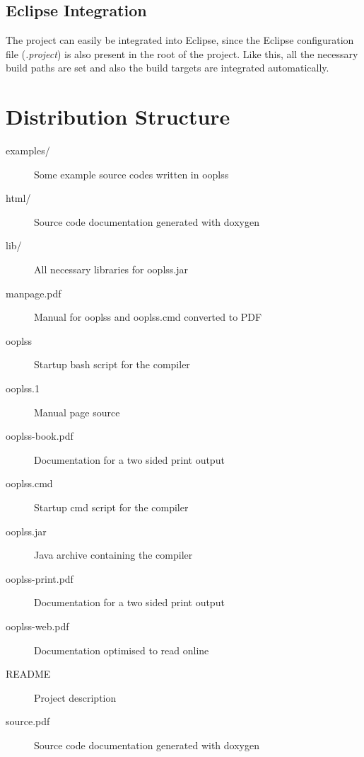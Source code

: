 \subsection{Eclipse Integration}

The project can easily be integrated into Eclipse, since the Eclipse
configuration file (\emph{.project}) is also present in the root of the
project. Like this, all the necessary build paths are set and also the
build targets are integrated automatically.

\section{Distribution Structure}

\begin{description}
\item[examples/] Some example source codes written in ooplss
\item[html/] Source code documentation generated with doxygen
\item[lib/] All necessary libraries for ooplss.jar
\item[manpage.pdf] Manual for ooplss and ooplss.cmd converted to PDF
\item[ooplss] Startup bash script for the compiler
\item[ooplss.1] Manual page source
\item[ooplss-book.pdf] Documentation for a two sided print output
\item[ooplss.cmd] Startup cmd script for the compiler
\item[ooplss.jar] Java archive containing the compiler
\item[ooplss-print.pdf] Documentation for a two sided print output
\item[ooplss-web.pdf] Documentation optimised to read online
\item[README] Project description
\item[source.pdf] Source code documentation generated with doxygen
\end{description}

